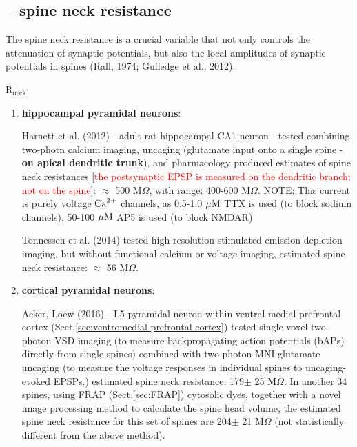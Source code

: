 \subsection{-- spine neck resistance}
\label{sec:spine-neck-resistance}

The spine neck resistance is a crucial variable that not only controls the
attenuation of synaptic potentials, but also the local amplitudes of synaptic
potentials in spines (Rall, 1974; Gulledge et al., 2012).
 
 \def\Rneck{{\text{R}_{\text{neck}}}}
 \def\MOhm{{\text{M}\Omega}}
 
$\Rneck$
\begin{enumerate}

   \item {\bf hippocampal pyramidal neurons}: 
 
Harnett et al. (2012) - adult rat hippocampal CA1 neuron - tested combining
two-photn calcium imaging, uncaging (glutamate input onto a single spine -
{\bf on apical dendritic trunk}), and pharmacology produced estimates of spine
neck resistances [\textcolor{red}{the postsynaptic EPSP is measured on the
dendritic branch; not on the spine}]: $\approx$ 500 $\MOhm$, with range:
400-600 $\MOhm$. NOTE: This current is purely voltage ${\text{Ca}^{2+}}$ channels, as
0.5-1.0 ${\mu\text{M}}$ TTX is used (to block sodium channels), 50-100 ${\mu\text{M}}$ AP5 is used
(to block NMDAR)

Tonnessen et al. (2014) tested high-resolution stimulated emission depletion
imaging, but without functional calcium or voltage-imaging, estimated spine neck
resistance: $\approx$ 56 $\MOhm$.
  
   \item {\bf cortical pyramidal neurons}:
   
Acker, Loew (2016) - L5 pyramidal neuron within ventral medial prefrontal cortex
(Sect.\ref{sec:ventromedial prefrontal cortex}) tested single-voxel two-photon
VSD imaging (to measure backpropagating action potentials (bAPs) directly from
single spines) combined with two-photon MNI-glutamate uncaging (to measure the
voltage responses in individual spines to uncaging-evoked EPSPs.) estimated
spine neck resistance: 179$\pm$ 25 $\MOhm$. In another 34 spines, using FRAP
(Sect.\ref{sec:FRAP}) cytosolic dyes, together with a novel image processing
method to calculate the spine head volume, the estimated spine neck resistance
for this set of spines are 204$\pm$ 21 $\MOhm$ (not statistically different from
the above method).
   
\end{enumerate}


